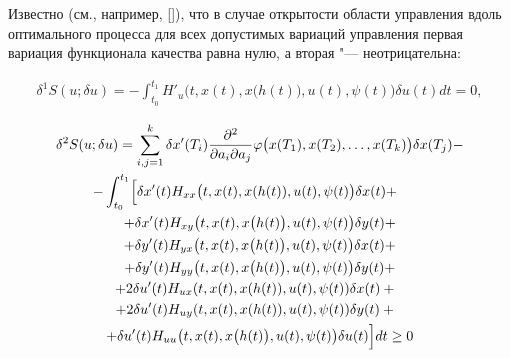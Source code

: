 Известно (см., например, []), что  в случае открытости области управления вдоль оптимального процесса для всех допустимых вариаций управления первая вариация функционала качества равна нулю, а вторая "--- неотрицательна:

\begin{gather}

\label{mans:eq19}

\delta^{1} S(u;  \delta u)= - \int_{t_{0}}^{t_{1}} H'_{u} \bigl(t, x(t), x\bigl(h(t)\bigr), u(t), \psi (t)\bigr) \delta u(t) dt = 0 , 

\end{gather}

\begin{multline}

\label{mans:eq20}

\delta^{2} S(u; \delta u)= \sum_{i,j=1}^{k} \delta x'(T_{i})  

\dfrac{\partial^{2} } {\partial a_{i} \partial a_{j}} 

\varphi \bigl(x(T_{1}), x(T_{2}), \ldots, x(T_{k})\bigr) \delta x(T_{j}) -   \\

-\int_{t_{0}}^{t_{1}} 

\Bigl[ \delta x'(t) H_{xx}\bigl(t, x(t), x(h(t)), u(t), \psi (t)\bigr) \delta x(t) + \hspace{.75cm}

\\

+ \delta x'(t) H_{xy}\bigl(t, x(t), x\bigl(h(t)\bigr), u(t), \psi (t)\bigr) \delta y(t) + \\

+\delta y'(t) H_{yx}\bigl(t, x(t), x\bigl(h(t)\bigr), u(t), \psi (t)\bigr) \delta x(t)+ \\ 

+ \delta y'(t) H_{yy}\bigl(t, x(t), x\bigl(h(t)\bigr), u(t), \psi (t)\bigr) \delta y(t)+  \\

+2 \delta u'(t) H_{ux}(t, x(t), x(h(t)), u(t), \psi (t)) \delta x(t)+ \phantom{2}\\

+ 2 \delta u'(t) H_{uy}(t, x(t), x(h(t)), u(t), \psi (t)) \delta y(t)+ \phantom{2}  \\

+\delta u'(t) H_{uu} \bigl(t, x(t), x\bigl(h(t)\bigr), u(t), \psi (t)\bigr) \delta u(t) \Bigr]dt  \geq 0  

\end{multline}

